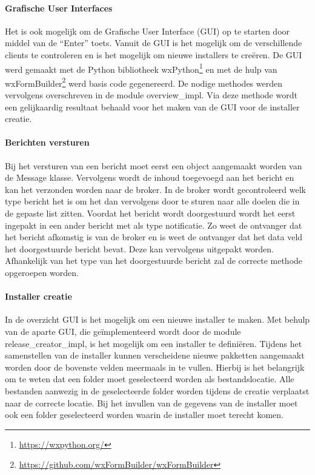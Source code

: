 \paragraph{Grafische User Interfaces}
Het is ook mogelijk om de Grafische User Interface (GUI) op te starten door middel van de ``Enter'' toets.
Vanuit de GUI is het mogelijk om de verschillende clients te controleren en is het mogelijk om nieuwe installers te creëren.
De GUI werd gemaakt met de Python bibliotheek wxPython\footnote{\url{https://wxpython.org/}} en met de hulp van wxFormBuilder\footnote{\url{https://github.com/wxFormBuilder/wxFormBuilder}} werd basis code gegenereerd.
De nodige methodes werden vervolgens overschreven in de module overview\_impl.
Via deze methode wordt een gelijkaardig resultaat behaald voor het maken van de GUI voor de installer creatie.

\paragraph{Berichten versturen}
Bij het versturen van een bericht moet eerst een object aangemaakt worden van de Message klasse.
Vervolgens wordt de inhoud toegevoegd aan het bericht en kan het verzonden worden naar de broker.
In de broker wordt gecontroleerd welk type bericht het is om het dan vervolgens door te sturen naar alle doelen die in de gepaste list zitten.
Voordat het bericht wordt doorgestuurd wordt het eerst ingepakt in een ander bericht met als type notificatie.
Zo weet de ontvanger dat het bericht afkomstig is van de broker en is weet de ontvanger dat het data veld het doorgestuurde bericht bevat.
Deze kan vervolgens uitgepakt worden.
Afhankelijk van het type van het doorgestuurde bericht zal de correcte methode opgeroepen worden.

\paragraph{Installer creatie}
In de overzicht GUI is het mogelijk om een nieuwe installer te maken.
Met behulp van de aparte GUI, die geïmplementeerd wordt door de module release\_creator\_impl, is het mogelijk om een installer te definiëren.
Tijdens het samenstellen van de installer kunnen verscheidene nieuwe pakketten aangemaakt worden door de bovenste velden meermaals in te vullen.
Hierbij is het belangrijk om te weten dat een folder moet geselecteerd worden als bestandslocatie.
Alle bestanden aanwezig in de geselecteerde folder worden tijdens de creatie verplaatst naar de correcte locatie.
Bij het invullen van de gegevens van de installer moet ook een folder geselecteerd worden waarin de installer moet terecht komen.

